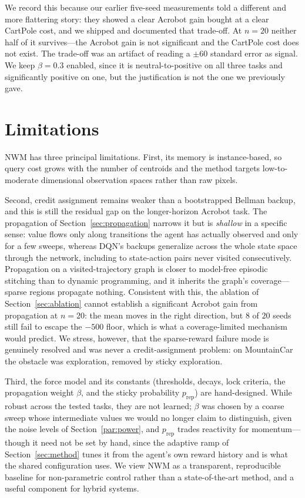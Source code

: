 \documentclass[11pt]{article}
\newcommand{\NWM}{\textsc{NWM}}
\begin{document}
We record this because our earlier five-seed measurements told a different and
more flattering story: they showed a clear Acrobot gain bought at a clear
CartPole cost, and we shipped and documented that trade-off. At $n{=}20$ neither
half of it survives---the Acrobot gain is not significant and the CartPole cost
does not exist. The trade-off was an artifact of reading a $\pm60$ standard
error as signal. We keep $\beta{=}0.3$ enabled, since it is neutral-to-positive
on all three tasks and significantly positive on one, but the justification is
not the one we previously gave.

\section{Limitations}
\label{sec:limitations}

\NWM{} has three principal limitations. First, its memory is instance-based, so
query cost grows with the number of centroids and the method targets
low-to-moderate dimensional observation spaces rather than raw pixels.

Second, credit assignment remains weaker than a bootstrapped Bellman backup,
and this is still the residual gap on the longer-horizon Acrobot task. The
propagation of Section~\ref{sec:propagation} narrows it but is \emph{shallow} in
a specific sense: value flows only along transitions the agent has actually
observed and only for a few sweeps, whereas DQN's backups generalize across the
whole state space through the network, including to state-action pairs never
visited consecutively. Propagation on a visited-trajectory graph is closer to
model-free episodic stitching than to dynamic programming, and it inherits the
graph's coverage---sparse regions propagate nothing. Consistent with this, the
ablation of Section~\ref{sec:ablation} cannot establish a significant Acrobot
gain from propagation at $n{=}20$: the mean moves in the right direction, but
$8$ of $20$ seeds still fail to escape the $-500$ floor, which is what a
coverage-limited mechanism would predict. We stress, however, that the
sparse-reward failure mode is genuinely resolved and was never a
credit-assignment problem: on MountainCar the obstacle was exploration, removed
by sticky exploration.

Third, the force model and its constants (thresholds, decays, lock criteria,
the propagation weight $\beta$, and the sticky probability $p_{\text{rep}}$)
are hand-designed. While robust across the tested tasks, they are not learned;
$\beta$ was chosen by a coarse sweep whose intermediate values we would no
longer claim to distinguish, given the noise levels of
Section~\ref{par:power}, and
$p_{\text{rep}}$ trades reactivity for momentum---though it need not be set by
hand, since the adaptive ramp of Section~\ref{sec:method} tunes it from the
agent's own reward history and is what the shared configuration uses.
We view \NWM{} as a transparent, reproducible baseline for non-parametric
control rather than a state-of-the-art method, and a useful component for
hybrid systems.
\end{document}
